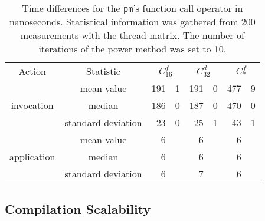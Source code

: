 \documentclass[10pt,a4paper]{article}
\theoremstyle{definition}\newtheorem{problem}{Problem}
\providecommand{\casex}[1]{\ensuremath{#1}}
\providecommand{\caseA}{\casex{C_{16}^f}}
\providecommand{\caseD}{\casex{C_{32}^d}}
\providecommand{\caseEf}{\casex{C_*^f}}
\begin{document}
\renewcommand{\arraystretch}{1.00}
\renewcommand{\tabcolsep}{2mm}
\begin{table}[t]
\caption{Time differences for the \texttt{pm}'s function call operator in nanoseconds. Statistical information was gathered from 200 measurements with the thread matrix. The number of iterations of the power method was set to 10.}
\begin{center}
\begin{tabular}{cc*{3}{r@{.}l}}
\toprule
Action & Statistic & \multicolumn{2}{c}{\caseA} & \multicolumn{2}{c}{\caseD} & \multicolumn{2}{c}{\caseEf} \rule[-0.5em]{0pt}{1.7em} \\ \cmidrule(r){1-1} \cmidrule(rl){2-2} \cmidrule(l){3-8}
\multirow{3}{*}{invocation} & mean value & 191 & 1 & 191 & 0 & 477 & 9 \rule[0em]{0pt}{1em} \\
& median & 186 & 0 & 187 & 0 & 470 & 0 \\
& standard deviation & 23 & 0 & 25 & 1 & 43 & 1 \\ \cmidrule(r){1-1} \cmidrule(rl){2-2} \cmidrule(l){3-8}
\multirow{3}{*}{application} & mean value & 6 &  & 6 &  & 6 &  \rule[0em]{0pt}{1.15em} \\
& median & 6 &  & 6 &  & 6 &  \\
& standard deviation & 6 &  & 7 &  & 6 &  \\
\bottomrule
\end{tabular}
\end{center}
\label{tab:to}
\end{table}


\subsection{Compilation Scalability}
\end{document}
